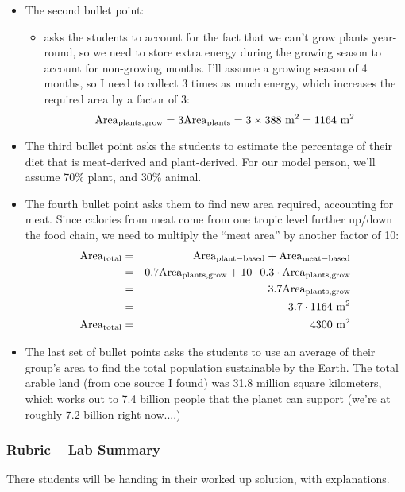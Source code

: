 \documentclass[fleqn,letterpaper]{article}
\begin{document}
\begin{itemize}
\item{The second bullet point:
  \begin{itemize}
  \item{asks the students to account for the fact that we can't grow plants year-round, so we need to store extra energy during the growing season to account for non-growing months.  I'll assume a growing season of 4 months, so I need to collect 3 times as much energy, which increases the required area by a factor of 3:
  \begin{equation}
   {\rm Area}_{\rm plants,grow} = 3 {\rm Area}_{\rm plants} = 3\times 388~{\rm m^2} = 1164~{\rm m^2}
  \end{equation}
}
  \end{itemize}}
\item{The third bullet point asks the students to estimate the percentage of their diet that is meat-derived and plant-derived.  For our model person, we'll assume 70\% plant, and 30\% animal.}
\item{The fourth bullet point asks them to find new area required, accounting for meat.  Since calories from meat come from one tropic level further up/down the food chain, we need to multiply the ``meat area'' by another factor of 10:
  \begin{eqnarray}
   {\rm Area}_{\rm total} & = & {\rm Area}_{\rm plant-based} + {\rm Area}_{\rm meat-based} \\
   & = & 0.7 {\rm Area}_{\rm plants,grow} + 10\cdot0.3\cdot{\rm Area}_{\rm plants,grow} \\
   & = & 3.7 {\rm Area}_{\rm plants,grow}  \\
   & = & 3.7 \cdot1164~{\rm m^2} \\
   {\rm Area}_{\rm total} & = & 4300~{\rm m^2} 
  \end{eqnarray}
}
\item{The last set of bullet points asks the students to use an average of their group's area to find the total population sustainable by the Earth.  The total arable land (from one source I found) was 31.8 million square kilometers, which works out to 7.4 billion people that the planet can support (we're at roughly 7.2 billion right now....)}
\end{itemize}

\subsubsection*{Rubric -- Lab Summary}

There students will be handing in their worked up solution, with explanations.
\end{document}
